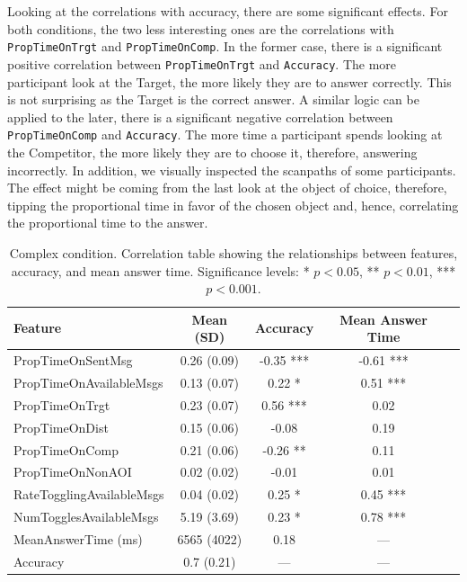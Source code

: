 Looking at the correlations with accuracy, there are some significant effects. For both conditions, the two less interesting ones are the correlations with \texttt{PropTimeOnTrgt} and \texttt{PropTimeOnComp}. In the former case, there is a significant positive correlation between \texttt{PropTimeOnTrgt} and \texttt{Accuracy}. The more participant look at the Target, the more likely they are to answer correctly. This is not surprising as the Target is the correct answer. A similar logic can be applied to the later, there is a significant negative correlation between \texttt{PropTimeOnComp} and \texttt{Accuracy}. The more time a participant spends looking at the Competitor, the more likely they are to choose it, therefore, answering incorrectly. In addition, we visually inspected the scanpaths of some participants. The effect might be coming from the last look at the object of choice, therefore, tipping the proportional time in favor of the chosen object and, hence, correlating the proportional time to the answer.

\begin{table}[h!]
\centering
\begin{tabular}{|l|c|c|c|c|}
\hline
\textbf{Feature} & \textbf{Mean (SD)} & \textbf{Accuracy} & \textbf{Mean Answer Time} \\ \hline
PropTimeOnSentMsg & 0.26 (0.09) & -0.35 *** & -0.61 *** \\ \hline
PropTimeOnAvailableMsgs & 0.13 (0.07) & 0.22 * & 0.51 *** \\ \hline
PropTimeOnTrgt & 0.23 (0.07) & 0.56 *** & 0.02 \\ \hline
PropTimeOnDist & 0.15 (0.06) & -0.08 & 0.19 \\ \hline
PropTimeOnComp & 0.21 (0.06) & -0.26 ** & 0.11 \\ \hline
PropTimeOnNonAOI & 0.02 (0.02) & -0.01 & 0.01 \\ \hline
RateTogglingAvailableMsgs & 0.04 (0.02) & 0.25 * & 0.45 *** \\ \hline
NumTogglesAvailableMsgs & 5.19 (3.69) & 0.23 * & 0.78 *** \\ \hline
MeanAnswerTime (ms) & 6565 (4022) & 0.18 & --- \\ \hline
Accuracy & 0.7 (0.21) & --- & --- \\ \hline
\end{tabular}
\caption{Complex condition. Correlation table showing the relationships between features, accuracy, and mean answer time. Significance levels: * $p < 0.05$, ** $p < 0.01$, *** $p < 0.001$.}
\label{tab:correlation_table_complex}
\end{table}

